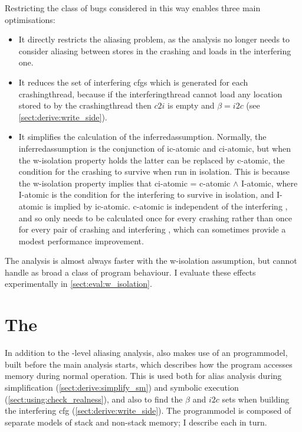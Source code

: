 Restricting the class of bugs considered in this way enables three
main optimisations:
\begin{itemize}
\item
  It directly restricts the aliasing problem, as the analysis no
  longer needs to consider aliasing between stores in the crashing
  {\StateMachine} and loads in the interfering one.
\item
  It reduces the set of interfering \glspl{cfg} which is generated for
  each \gls{crashingthread}, because if the \gls{interferingthread}
  cannot load any location stored to by the \gls{crashingthread} then
  $c2i$ is empty and $\beta = i2c$ (see
  \autoref{sect:derive:write_side}).
\item
  It simplifies the calculation of the \gls{inferredassumption}.
  Normally, the \gls{inferredassumption} is the conjunction of
  \gls{ic-atomic} and \gls{ci-atomic}, but when the \gls{w-isolation}
  property holds the latter can be replaced by \gls{c-atomic}, the
  condition for the crashing {\StateMachine} to survive when run in
  isolation.  This is because the \gls{w-isolation} property implies
  that \gls{ci-atomic} = \gls{c-atomic} $\wedge$ I-atomic, where
  I-atomic is the condition for the interfering {\StateMachine} to
  survive in isolation, and I-atomic is implied by \gls{ic-atomic}.
  \gls{c-atomic} is independent of the interfering {\StateMachine},
  and so only needs to be calculated once for every crashing
  {\StateMachine} rather than once for every pair of crashing and
  interfering {\StateMachines}, which can sometimes provide a modest
  performance improvement.
\end{itemize}
The analysis is almost always faster with the \gls{w-isolation}
assumption, but cannot handle as broad a class of program behaviour.
I evaluate these effects experimentally in
\autoref{sect:eval:w_isolation}.

\section{The }
\label{sect:program_model}

In addition to the {\StateMachine}-level aliasing analysis,
{\technique} also makes use of an \gls{programmodel}, built before the
main analysis starts, which describes how the program accesses memory
during normal operation.  This is used both for alias analysis during
{\StateMachine} simplification (\autoref{sect:derive:simplify_sm}) and
symbolic execution (\autoref{sect:using:check_realness}), and also to
find the $\beta$ and $i2c$ sets when building the interfering
\gls{cfg} (\autoref{sect:derive:write_side}).  The \gls{programmodel}
is composed of separate models of stack and non-stack memory; I
describe each in turn.

